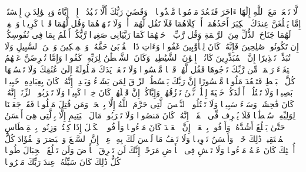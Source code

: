 \startbuffer[\q:17:22]
لَّا تَجۡعَلۡ مَعَ ٱللَّهِ إِلَٰهًا ءَاخَرَ فَتَقۡعُدَ مَذۡمُومࣰا مَّخۡذُولࣰا%
\stopbuffer
\startbuffer[\q:17:23]
۞ وَقَضَىٰ رَبُّكَ أَلَّا تَعۡبُدُوۤا۟ إِلَّاۤ إِیَّاهُ وَبِٱلۡوَٰلِدَیۡنِ إِحۡسَٰنًاۚ إِمَّا یَبۡلُغَنَّ عِندَكَ ٱلۡكِبَرَ أَحَدُهُمَاۤ أَوۡ كِلَاهُمَا فَلَا تَقُل لَّهُمَاۤ أُفࣲّ وَلَا تَنۡهَرۡهُمَا وَقُل لَّهُمَا قَوۡلࣰا كَرِیمࣰا%
\stopbuffer
\startbuffer[\q:17:24]
وَٱخۡفِضۡ لَهُمَا جَنَاحَ ٱلذُّلِّ مِنَ ٱلرَّحۡمَةِ وَقُل رَّبِّ ٱرۡحَمۡهُمَا كَمَا رَبَّیَانِی صَغِیرࣰا%
\stopbuffer
\startbuffer[\q:17:25]
رَّبُّكُمۡ أَعۡلَمُ بِمَا فِی نُفُوسِكُمۡۚ إِن تَكُونُوا۟ صَٰلِحِینَ فَإِنَّهُۥ كَانَ لِلۡأَوَّٰبِینَ غَفُورࣰا%
\stopbuffer
\startbuffer[\q:17:26]
وَءَاتِ ذَا ٱلۡقُرۡبَىٰ حَقَّهُۥ وَٱلۡمِسۡكِینَ وَٱبۡنَ ٱلسَّبِیلِ وَلَا تُبَذِّرۡ تَبۡذِیرًا%
\stopbuffer
\startbuffer[\q:17:27]
إِنَّ ٱلۡمُبَذِّرِینَ كَانُوۤا۟ إِخۡوَٰنَ ٱلشَّیَٰطِینِۖ وَكَانَ ٱلشَّیۡطَٰنُ لِرَبِّهِۦ كَفُورࣰا%
\stopbuffer
\startbuffer[\q:17:28]
وَإِمَّا تُعۡرِضَنَّ عَنۡهُمُ ٱبۡتِغَاۤءَ رَحۡمَةࣲ مِّن رَّبِّكَ تَرۡجُوهَا فَقُل لَّهُمۡ قَوۡلࣰا مَّیۡسُورࣰا%
\stopbuffer
\startbuffer[\q:17:29]
وَلَا تَجۡعَلۡ یَدَكَ مَغۡلُولَةً إِلَىٰ عُنُقِكَ وَلَا تَبۡسُطۡهَا كُلَّ ٱلۡبَسۡطِ فَتَقۡعُدَ مَلُومࣰا مَّحۡسُورًا%
\stopbuffer
\startbuffer[\q:17:30]
إِنَّ رَبَّكَ یَبۡسُطُ ٱلرِّزۡقَ لِمَن یَشَاۤءُ وَیَقۡدِرُۚ إِنَّهُۥ كَانَ بِعِبَادِهِۦ خَبِیرَۢا بَصِیرࣰا%
\stopbuffer
\startbuffer[\q:17:31]
وَلَا تَقۡتُلُوۤا۟ أَوۡلَٰدَكُمۡ خَشۡیَةَ إِمۡلَٰقࣲۖ نَّحۡنُ نَرۡزُقُهُمۡ وَإِیَّاكُمۡۚ إِنَّ قَتۡلَهُمۡ كَانَ خِطۡءࣰا كَبِیرࣰا%
\stopbuffer
\startbuffer[\q:17:32]
وَلَا تَقۡرَبُوا۟ ٱلزِّنَىٰۤۖ إِنَّهُۥ كَانَ فَٰحِشَةࣰ وَسَاۤءَ سَبِیلࣰا%
\stopbuffer
\startbuffer[\q:17:33]
وَلَا تَقۡتُلُوا۟ ٱلنَّفۡسَ ٱلَّتِی حَرَّمَ ٱللَّهُ إِلَّا بِٱلۡحَقِّۗ وَمَن قُتِلَ مَظۡلُومࣰا فَقَدۡ جَعَلۡنَا لِوَلِیِّهِۦ سُلۡطَٰنࣰا فَلَا یُسۡرِف فِّی ٱلۡقَتۡلِۖ إِنَّهُۥ كَانَ مَنصُورࣰا%
\stopbuffer
\startbuffer[\q:17:34]
وَلَا تَقۡرَبُوا۟ مَالَ ٱلۡیَتِیمِ إِلَّا بِٱلَّتِی هِیَ أَحۡسَنُ حَتَّىٰ یَبۡلُغَ أَشُدَّهُۥۚ وَأَوۡفُوا۟ بِٱلۡعَهۡدِۖ إِنَّ ٱلۡعَهۡدَ كَانَ مَسۡءُولࣰا%
\stopbuffer
\startbuffer[\q:17:35]
وَأَوۡفُوا۟ ٱلۡكَیۡلَ إِذَا كِلۡتُمۡ وَزِنُوا۟ بِٱلۡقِسۡطَاسِ ٱلۡمُسۡتَقِیمِۚ ذَٰلِكَ خَیۡرࣱ وَأَحۡسَنُ تَأۡوِیلࣰا%
\stopbuffer
\startbuffer[\q:17:36]
وَلَا تَقۡفُ مَا لَیۡسَ لَكَ بِهِۦ عِلۡمٌۚ إِنَّ ٱلسَّمۡعَ وَٱلۡبَصَرَ وَٱلۡفُؤَادَ كُلُّ أُو۟لَٰۤئِكَ كَانَ عَنۡهُ مَسۡءُولࣰا%
\stopbuffer
\startbuffer[\q:17:37]
وَلَا تَمۡشِ فِی ٱلۡأَرۡضِ مَرَحًاۖ إِنَّكَ لَن تَخۡرِقَ ٱلۡأَرۡضَ وَلَن تَبۡلُغَ ٱلۡجِبَالَ طُولࣰا%
\stopbuffer
\startbuffer[\q:17:38]
كُلُّ ذَٰلِكَ كَانَ سَیِّئُهُۥ عِندَ رَبِّكَ مَكۡرُوهࣰا%
\stopbuffer
